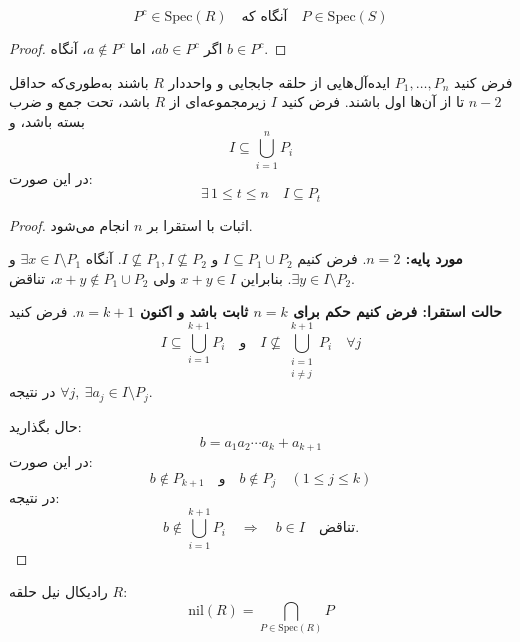 \begin{tcolorbox}[colframe=black, coltitle=black, title=تعریف]
    \[
        P^c \in \mathrm{Spec}(R) \quad \text{آنگاه که} \quad P \in \mathrm{Spec}(S)
    \]
\end{tcolorbox}

\begin{proof}
    اگر \( ab \in P^c \)، اما \( a \notin P^c \)، آنگاه \( b \in P^c \).
\end{proof}

\begin{tcolorbox}[colframe=black, coltitle=black, title=قضیه (Prime Avoidance Theorem)]
    فرض کنید \( P_1, \dots, P_n \) ایده‌آل‌هایی از حلقه جابجایی و واحددار \( R \) باشند به‌طوری‌که حداقل \( n - 2 \) تا از آن‌ها اول باشند. فرض کنید \( I \) زیرمجموعه‌ای از \( R \) باشد، تحت جمع و ضرب بسته باشد، و
    \[
        I \subseteq \bigcup_{i = 1}^{n} P_i
    \]
    در این صورت:
    \[
        \exists\, 1 \leq t \leq n \quad I \subseteq P_t
    \]
\end{tcolorbox}

\begin{proof}
    اثبات با استقرا بر \( n \) انجام می‌شود.

    \textbf{مورد پایه: \( n = 2 \)}. فرض کنیم \( I \subseteq P_1 \cup P_2 \) و \( I \not\subseteq P_1, I \not\subseteq P_2 \). آنگاه \( \exists x \in I \setminus P_1 \) و \( \exists y \in I \setminus P_2 \). بنابراین \( x+y \in I \) ولی \( x+y \notin P_1 \cup P_2 \)، تناقض.

    \textbf{حالت استقرا: فرض کنیم حکم برای \( n = k \) ثابت باشد و اکنون \( n = k + 1 \)}. فرض کنید
    \[
        I \subseteq \bigcup_{i = 1}^{k+1} P_i \quad \text{و} \quad I \not\subseteq \bigcup_{\substack{i = 1 \\ i \ne j}}^{k+1} P_i \quad \forall j
    \]
    در نتیجه \( \forall j,\ \exists a_j \in I \setminus P_j \).

    حال بگذارید:
    \[
        b = a_1 a_2 \cdots a_k + a_{k+1}
    \]
    در این صورت:
    \[
        b \notin P_{k+1} \quad \text{و} \quad b \notin P_j \quad (1 \le j \le k)
    \]
    در نتیجه:
    \[
        b \notin \bigcup_{i=1}^{k+1} P_i \quad \Rightarrow \quad b \in I \quad \text{تناقض}.
    \]
\end{proof}

\begin{tcolorbox}[colframe=black, coltitle=black, title=تعریف]
    رادیکال نیل حلقه \( R \):
    \[
        \mathrm{nil}(R) = \bigcap_{P \in \mathrm{Spec}(R)} P
    \]
\end{tcolorbox}

